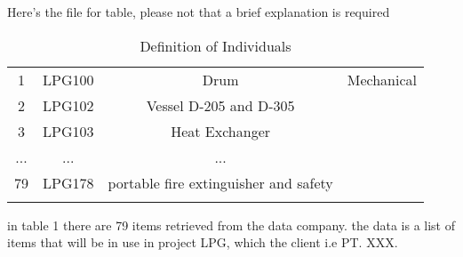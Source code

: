 Here's the file for table, please not that a brief explanation is required

\begin{table}[h]
    \centering
    \begin{tabular}{cccc}
    \hline
    1 & LPG100 & Drum & Mechanical \\
    2 & LPG102 & Vessel D-205 and D-305 \\
    3 & LPG103 & Heat Exchanger \\
    ... & ... & ... \\
    79 & LPG178 & portable fire extinguisher and safety \\
         & 
    \hline
    \end{tabular}
    \caption{Definition of Individuals}
\end{table}

\par in table 1 there are 79 items retrieved from the data company. the data is a list of items that will be in use in project LPG, which the client i.e PT. XXX. 